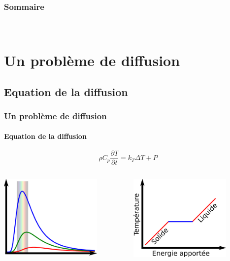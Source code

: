 \documentclass{beamer}
\begin{document}
\begin{frame}
	\frametitle{Sommaire}
	\framesubtitle{\ }
	\tableofcontents
\end{frame}

\section{Un problème de diffusion}
\subsection{Equation de la diffusion}

\begin{frame}
	\frametitle{Un problème de diffusion}
	\framesubtitle{Equation de la diffusion}

{\Large
$$\rho C_p \dfrac{\partial T}{\partial t}= k_{T} \Delta T  + P$$
}
\begin{columns}
    \begin{column}{6cm}
	\end{column}

	\begin{column}{6cm}
	\end{column}
\end{columns}

\begin{columns}
    \begin{column}{6cm}      
	  \center \includegraphics[width = 5cm]{figures/blackbody.pdf}  
	\end{column}

	\begin{column}{6cm}     
      \center \includegraphics[width = 5cm]{figures/lattentheat.pdf}
      \vspace{-0.4cm}
      
	\end{column}
\end{columns}

\end{frame}
\end{document}
